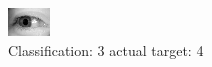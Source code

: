 \begin{figure}[h!]
\begin{center}
\includegraphics[width=0.60\columnwidth]{figures/ID3191_class_3_target_4.png}
\end{center}
\caption{ Classification: 3 actual target: 4}
\label{fig:ID3191_class_3_target_4}
\end{figure}
